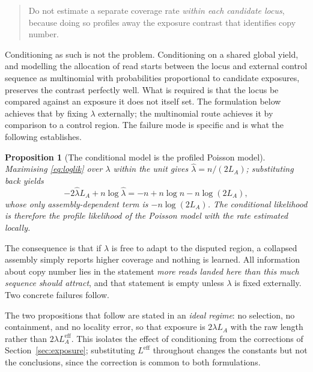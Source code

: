 \documentclass[11pt]{article}
\newtheorem{proposition}{Proposition}
\begin{document}
\begin{quote}
Do not estimate a separate coverage rate \emph{within each candidate locus},
because doing so profiles away the exposure contrast that identifies copy
number.
\end{quote}

Conditioning as such is not the problem.  Conditioning on a shared global
yield, and modelling the allocation of read starts between the locus and
external control sequence as multinomial with probabilities proportional to
candidate exposures, preserves the contrast perfectly well.  What is required
is that the locus be compared against an exposure it does not itself set.  The
formulation below achieves that by fixing $\lambda$ externally; the multinomial
route achieves it by comparison to a control region.  The failure mode is
specific and is what the following establishes.

\begin{proposition}[The conditional model is the profiled Poisson model]
\label{prop:profile}
Maximising \eqref{eq:loglik} over $\lambda$ within the unit gives
$\hat\lambda = n/(2L_A)$; substituting back yields
\begin{equation}
    -2\hat\lambda L_A + n\log\hat\lambda
    = -n + n\log n - n\log(2L_A),
\end{equation}
whose only assembly-dependent term is $-n\log(2L_A)$.  The conditional
likelihood is therefore the profile likelihood of the Poisson model with the
rate estimated locally.
\end{proposition}

The consequence is that if $\lambda$ is free to adapt to the disputed region, a
collapsed assembly simply reports higher coverage and nothing is learned.  All
information about copy number lies in the statement \emph{more reads landed here
than this much sequence should attract}, and that statement is empty unless
$\lambda$ is fixed externally.  Two concrete failures follow.

The two propositions that follow are stated in an \emph{ideal regime}: no
selection, no containment, and no locality error, so that exposure is $2\lambda
L_A$ with the raw length rather than $2\lambda L_A^{\mathrm{eff}}$.  This
isolates the effect of conditioning from the corrections of
Section~\ref{sec:exposure}; substituting $L^{\mathrm{eff}}$ throughout changes
the constants but not the conclusions, since the correction is common to both
formulations.
\end{document}

